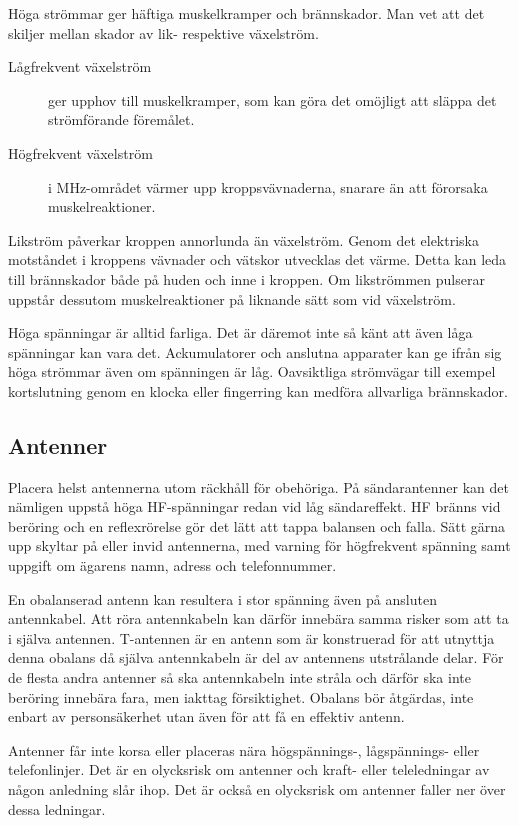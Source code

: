 Höga strömmar ger häftiga muskelkramper och brännskador.
Man vet att det skiljer mellan skador av lik- respektive växelström.

\begin{description}
\item[Lågfrekvent växelström] ger upphov till muskelkramper, som kan göra det
omöjligt att släppa det strömförande föremålet.

\item[Högfrekvent växelström] i MHz-området värmer upp kroppsvävnaderna,
snarare än att förorsaka muskelreaktioner.
\end{description}

Likström påverkar kroppen annorlunda än växelström.
Genom det elektriska motståndet i kroppens vävnader och vätskor utvecklas det
värme.
Detta kan leda till brännskador både på huden och inne i kroppen.
Om likströmmen pulserar uppstår dessutom muskelreaktioner på liknande sätt som
vid växelström.

Höga spänningar är alltid farliga.
Det är däremot inte så känt att även låga spänningar kan vara det.
Ackumulatorer och anslutna apparater kan ge ifrån sig höga strömmar även om
spänningen är låg.
Oavsiktliga strömvägar till exempel kortslutning genom en klocka eller
fingerring kan medföra allvarliga brännskador.

\subsection{Antenner}

Placera helst antennerna utom räckhåll för obehöriga.
På sändarantenner kan det nämligen uppstå höga HF-spänningar redan vid
låg sändareffekt.
HF bränns vid beröring och en reflexrörelse gör det lätt att tappa balansen och
falla.
Sätt gärna upp skyltar på eller invid antennerna, med varning för högfrekvent
spänning samt uppgift om ägarens namn, adress och telefonnummer.

En obalanserad antenn kan resultera i stor spänning även på ansluten
antennkabel.
Att röra antennkabeln kan därför innebära samma risker som att ta i själva
antennen.
T-antennen är en antenn som är konstruerad för att utnyttja denna obalans då
själva antennkabeln är del av antennens utstrålande delar.
För de flesta andra antenner så ska antennkabeln inte stråla och därför ska inte
beröring innebära fara, men iakttag försiktighet.
Obalans bör åtgärdas, inte enbart av personsäkerhet utan även för att få en
effektiv antenn.

Antenner får inte korsa eller placeras nära
hög\-spännings-, låg\-spännings- eller
telefonlinjer.
Det är en olycksrisk om antenner och kraft- eller teleledningar av någon
anledning slår ihop.
Det är också en olycksrisk om antenner faller ner över dessa ledningar.

